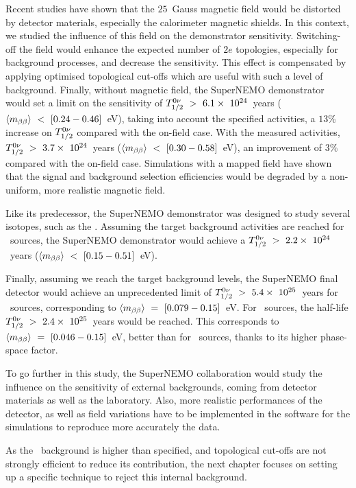 Recent studies have shown that the $25$~Gauss magnetic field would be distorted by detector materials, especially the calorimeter magnetic shields.
In this context, we studied the influence of this field on the demonstrator sensitivity.
Switching-off the field would enhance the expected number of $2e$ topologies, especially for background processes, and decrease the sensitivity.
This effect is compensated by applying optimised topological cut-offs which are useful with such a level of background.
Finally, without magnetic field, the SuperNEMO demonstrator would set a limit on the sensitivity of $T_{1/2}^{0\nu}~>~6.1\times~10^{24}$~years ($\langle m_{\beta\beta}\rangle~<~[0.24-0.46]$~eV), taking into account the specified activities, a $13$\% increase on $T_{1/2}^{0\nu}$ compared with the on-field case.
With the measured activities, $T_{1/2}^{0\nu}~>~3.7\times~10^{24}$~years ($\langle m_{\beta\beta}\rangle~<~[0.30-0.58]$~eV), an improvement of $3$\% compared with the on-field case.
Simulations with a mapped field have shown that the signal and background selection efficiencies would be degraded by a non-uniform, more realistic magnetic field.

Like its predecessor, the SuperNEMO demonstrator was designed to study several isotopes, such as the \Nd.
Assuming the target background activities are reached for \Nd\ sources, the SuperNEMO demonstrator would achieve a $T_{1/2}^{0\nu}~>~2.2\times~10^{24}$~years ($\langle m_{\beta\beta}\rangle~<~[0.15-0.51]$~eV).

Finally, assuming we reach the target background levels, the SuperNEMO final detector would achieve an unprecedented limit of $T_{1/2}^{0\nu}~>~5.4\times~10^{25}$~years for \Se\ sources, corresponding to $\langle m_{\beta\beta}\rangle~=~[0.079-0.15]$~eV.
For \Nd\ sources, the half-life $T_{1/2}^{0\nu}~>~2.4\times~10^{25}$~years would be reached.
This corresponds to $\langle m_{\beta\beta}\rangle~=~[0.046-0.15]$~eV, better than for \Se\ sources, thanks to its higher phase-space factor.

To go further in this study, the SuperNEMO collaboration would study the influence on the sensitivity of external backgrounds, coming from detector materials as well as the laboratory.
Also, more realistic performances of the detector, as well as field variations have to be implemented in the software for the simulations to reproduce more accurately the data.

As the \Tl\ background is higher than specified, and topological cut-offs are not strongly efficient to reduce its contribution, the next chapter focuses on setting up a specific technique to reject this internal background.

